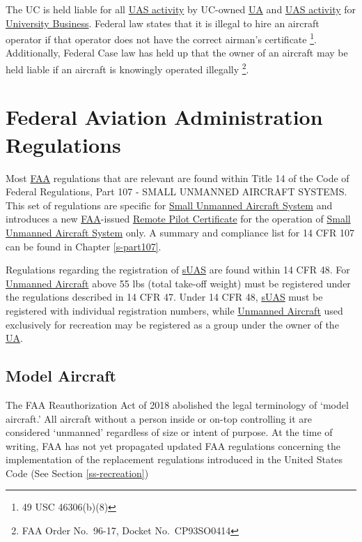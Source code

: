 \documentclass[
]{book}
\begin{document}
The UC is held liable for all \protect\hyperlink{UASactivity}{UAS activity} by UC-owned \protect\hyperlink{UA}{UA} and \protect\hyperlink{UASactivity}{UAS activity} for \protect\hyperlink{UB}{University Business}. Federal law states that it is illegal to hire an aircraft operator if that operator does not have the correct airman's certificate \footnote{49 USC 46306(b)(8)}. Additionally, Federal Case law has held up that the owner of an aircraft may be held liable if an aircraft is knowingly operated illegally \footnote{FAA Order No.~96-17, Docket No.~CP93SO0414}.

\hypertarget{federal-aviation-administration-regulations}{%
\section{Federal Aviation Administration Regulations}\label{federal-aviation-administration-regulations}}

Most \protect\hyperlink{FAA}{FAA} regulations that are relevant are found within Title 14 of the Code of Federal Regulations, Part 107 - SMALL UNMANNED AIRCRAFT SYSTEMS. This set of regulations are specific for \protect\hyperlink{sUAS}{Small Unmanned Aircraft System} and introduces a new \protect\hyperlink{FAA}{FAA}-issued \protect\hyperlink{RPC}{Remote Pilot Certificate} for the operation of \protect\hyperlink{sUAS}{Small Unmanned Aircraft System} only. A summary and compliance list for 14 CFR 107 can be found in Chapter \ref{s-part107}.

Regulations regarding the registration of \protect\hyperlink{sUAS}{sUAS} are found within 14 CFR 48. For \protect\hyperlink{UA}{Unmanned Aircraft} above 55 lbs (total take-off weight) must be registered under the regulations described in 14 CFR 47. Under 14 CFR 48, \protect\hyperlink{sUAS}{sUAS} must be registered with individual registration numbers, while \protect\hyperlink{UA}{Unmanned Aircraft} used exclusively for recreation may be registered as a group under the owner of the \protect\hyperlink{UA}{UA}.

\hypertarget{model-aircraft}{%
\subsection{Model Aircraft}\label{model-aircraft}}

The FAA Reauthorization Act of 2018 abolished the legal terminology of `model aircraft.' All aircraft without a person inside or on-top controlling it are considered `unmanned' regardless of size or intent of purpose. At the time of writing, FAA has not yet propagated updated FAA regulations concerning the implementation of the replacement regulations introduced in the United States Code (See Section \ref{ss-recreation})
\end{document}
